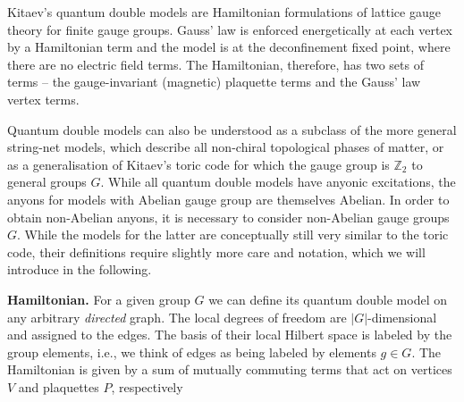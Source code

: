 \documentclass[two column]{article}
\begin{document}
Kitaev's quantum double models are Hamiltonian formulations of lattice gauge theory for finite gauge groups. Gauss' law is enforced energetically at each vertex by a Hamiltonian term and the model is at the deconfinement fixed point, where there are no electric field terms.
The Hamiltonian, therefore, has two sets of terms -- the gauge-invariant (magnetic) plaquette terms and the Gauss' law vertex terms\cite{cui2018topological, Kitaev_2003}. 

Quantum double models can also be understood as a subclass of the more general string-net models\cite{Levin_2005}, which describe all non-chiral topological phases of matter, or as a generalisation of Kitaev's toric code\cite{Kitaev_2003} for which the gauge group is $\mathbb Z_2$ to general groups $G$. While all quantum double models have anyonic excitations, the anyons for models with Abelian gauge group are themselves Abelian. In order to obtain non-Abelian anyons, it is necessary to consider non-Abelian gauge groups $G$. While the models for the latter are conceptually still very similar to the toric code, their definitions require slightly more care and notation, which we will introduce in the following. 

\textbf{Hamiltonian.}
For a given group $G$ we can define its quantum double model on any arbitrary \emph{directed} graph. The local degrees of freedom are $|G|$-dimensional and assigned to the edges. The basis of their local Hilbert space is labeled by the group elements, i.e., we think of edges as being labeled by elements $g\in G$. The Hamiltonian is given by a sum of mutually commuting terms that act on vertices $V$ and plaquettes $P$, respectively


\end{document}
